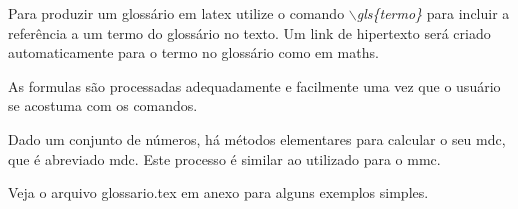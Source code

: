 Para produzir um glossário em \Gls{latex} utilize o comando \emph{$\backslash$gls\{termo\}} para incluir a referência a um termo do glossário no texto. Um link de hipertexto será criado automaticamente para o termo no glossário como em \gls{maths}. 

As \glspl{formula} são processadas adequadamente e facilmente uma vez que o usuário se acostuma com os comandos. 
 
Dado um conjunto de números, há métodos elementares para calcular o seu \acrlong{mdc}, que é abreviado \acrshort{mdc}. Este processo é similar ao utilizado para o  \acrfull{mmc}.

Veja o arquivo glossario.tex em anexo para alguns exemplos simples.

